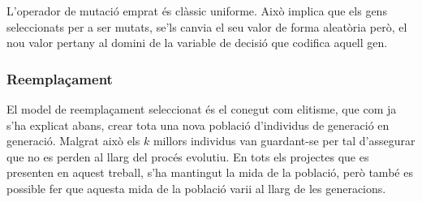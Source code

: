 L'operador de mutació emprat és clàssic uniforme. Això implica que els gens
seleccionats per a ser mutats, se'ls canvia el seu valor de forma aleatòria
però, el nou valor pertany al domini de la variable de decisió que codifica
aquell gen.

\subsubsection{Reemplaçament}

El model de reemplaçament seleccionat és el conegut com elitisme, que com ja
s'ha explicat abans, crear tota una nova població d'individus de generació en
generació. Malgrat això els $k$ millors individus van guardant-se per tal
d'assegurar que no es perden al llarg del procés evolutiu.  En tots els
projectes que es presenten en aquest treball, s'ha mantingut la mida de la
població, però també es possible fer que aquesta mida de la població varii al
llarg de les generacions.




